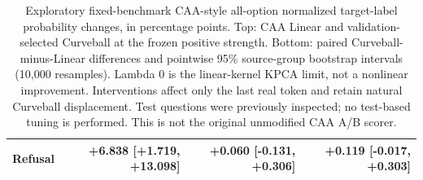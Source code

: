 \begin{table}[t]
{\begin{tabular}{lrrr}
Refusal & +6.838 [+1.719, +13.098] & +0.060 [-0.131, +0.306] & +0.119 [-0.017, +0.303] \\
\bottomrule
\end{tabular}}
\caption{Exploratory fixed-benchmark CAA-style all-option normalized target-label probability changes, in percentage points. Top: CAA Linear and validation-selected Curveball at the frozen positive strength. Bottom: paired Curveball-minus-Linear differences and pointwise 95\% source-group bootstrap intervals (10,000 resamples). Lambda 0 is the linear-kernel KPCA limit, not a nonlinear improvement. Interventions affect only the last real token and retain natural Curveball displacement. Test questions were previously inspected; no test-based tuning is performed. This is not the original unmodified CAA A/B scorer.}
\label{tab:main_results}
\end{table}
